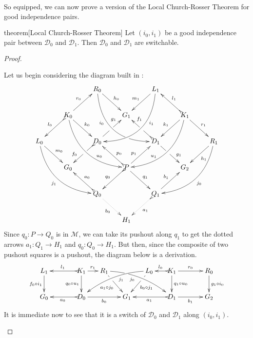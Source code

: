 \documentclass[a4paper,UKenglish,cleveref,pdftex, thm-restate,numberwithinsect]{lipics}
\newcommand{\dder}[1]{\mathscr{#1}}
\begin{document}
So equipped, we can now prove a version of the Local Church-Rosser Theorem for good independence pairs.

\begin{theoremEnd}[category=sec3]{theorem}[Local Church-Rosser Theorem]
  \label{thm:church}
  Let $(i_0, i_1)$ be a good independence pair
  between $\dder{D}_0$ and $\dder{D}_1$. Then $\dder{D}_0$ and
  $\dder{D}_1$ are switchable.
\end{theoremEnd}
\begin{proof}
  \begin{proofEnd}
    Let us begin considering the diagram
    built in :
    \[\xymatrix{&&R_0
        \ar@/_1cm/[ddrr]_(.35){i_0}|(.7)\hole \ar[dr]^{h_0}&&
        L_1\ar@/^1cm/[ddll]^(.35){i_1}
        \ar[dl]_{m_1}\\&K_0\ar[dr]^{k_0}\ar@{>->}[dl]_{l_0}
        \ar@/_.8cm/[ddrr]^(.65){u_0}\ar[ur]^{r_0}&& G_1 && K_1
        \ar@/^.8cm/[ddll]_(.65){u_1}\ar[dl]_{k_1}\ar@{>->}[lu]_{l_1}
        \ar[dr]^{r_1}\\L_0 \ar[dr]^{m_0} \ar@{>}@/_.8cm/[ddrr]_{j_1}&& D_0
        \ar@{>->}[dl]|(.42)\hole_(.64){f_0}\ar[ur]|(.48)\hole^(.7){g_1}&&D_1
        \ar[dr]|(.42)\hole^(.65){g_1}
        \ar@{>->}[ul]|(.48)\hole_(.7){f_1}&&R_1\ar@/^.8cm/[ddll]^{j_0}\ar[dl]^{h_1}\\&G_0
        &&P\ar[dr]^{q_1}
        \ar@{>->}[dl]_{q_0}\ar[ur]^(.4){p_1}\ar@{>->}[ul]_(.4){p_0}&&G_2\\&&Q_0
        \ar@{>->}@{>->}[ul]_{a_0} \ar@{.>}[dr]_{b_0} &&Q_1\ar[ur]^{b_1}
        \ar@{>.>}[dl]^{a_1} \\ &&&H_1 }\] Since $q_0\colon P\to Q_0$ is in
    $\mathcal{M}$, we can take its pushout along $q_1$ to get the dotted
    arrows $a_1\colon Q_1\to H_1$ and $q_0\colon Q_0\to H_1$. But then,
    since the composite of two pushout squares is a pushout, the diagram
    below is a derivation.
    \[\xymatrix@C=15pt{L_1 \ar[d]_{f_0 \circ i_1}&& K_1
        \ar[d]_{q_0\circ u_1}\ar@{>->}[ll]_{l_1} \ar[r]^{r_1} & R_1
        \ar@/^.35cm/[drrr]|(.3)\hole_(.4){j_0} \ar[dr]|(.3)\hole_{a_1\circ
          j_0} && L_0 \ar@/_.35cm/[dlll]^(.4){j_1} \ar[dl]|(.3)\hole^{b_0\circ
          j_1}& K_1 \ar[d]^{q_1\circ u_0}\ar@{>->}[l]_{l_0} \ar[rr]^{r_0} && R_0
        \ar[d]^{g_1\circ i_0} \\G_0 && \ar@{>->}[ll]^{a_0} D_0 \ar[rr]_{b_0}&&
        G_1 && \ar@{>->}[ll]^{a_1} D_1 \ar[rr]_{b_1}&& G_2}\] It is immediate
    now to see that it is a switch of $\dder{D}_0$ and $\dder{D}_1$ along
    $(i_0, i_1)$.
  \end{proofEnd}
\end{proof}
\end{document}
